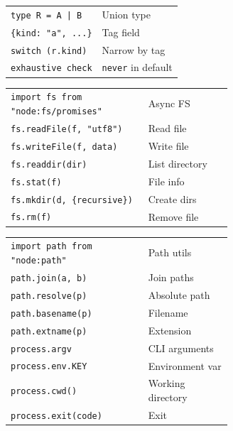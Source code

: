 \documentclass[10pt]{extarticle}
\begin{document}
\begin{multicols}{2}
\begin{tabularx}{\linewidth}{@{}l@{\enspace}Y@{}}
\texttt{type R = A | B}              & Union type \\
\texttt{\{kind: "a", ...\}}         & Tag field \\
\texttt{switch (r.kind)}             & Narrow by tag \\
\texttt{exhaustive check}            & \texttt{never} in default \\
\end{tabularx}

\begin{tabularx}{\linewidth}{@{}>{\raggedright\arraybackslash}p{0.62\linewidth}@{\enspace}Y@{}}
\texttt{import fs from "node:fs/promises"} & Async FS \\
\texttt{fs.readFile(f, "utf8")}     & Read file \\
\texttt{fs.writeFile(f, data)}      & Write file \\
\texttt{fs.readdir(dir)}            & List directory \\
\texttt{fs.stat(f)}                 & File info \\
\texttt{fs.mkdir(d, \{recursive\})} & Create dirs \\
\texttt{fs.rm(f)}                   & Remove file \\
\end{tabularx}

\begin{tabularx}{\linewidth}{@{}>{\raggedright\arraybackslash}p{0.62\linewidth}@{\enspace}Y@{}}
\texttt{import path from "node:path"} & Path utils \\
\texttt{path.join(a, b)}             & Join paths \\
\texttt{path.resolve(p)}             & Absolute path \\
\texttt{path.basename(p)}           & Filename \\
\texttt{path.extname(p)}            & Extension \\
\texttt{process.argv}                & CLI arguments \\
\texttt{process.env.KEY}            & Environment var \\
\texttt{process.cwd()}               & Working directory \\
\texttt{process.exit(code)}          & Exit \\
\end{tabularx}


\end{multicols}
\end{document}
